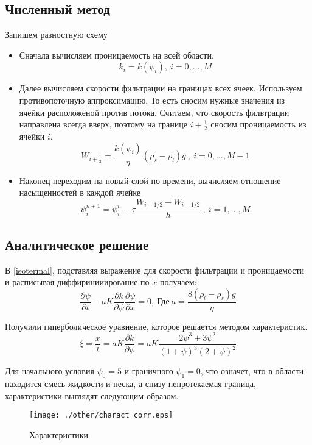 \documentclass[12pt,a4paper]{article}
\newcommand{\pd}[2]{\frac{\partial #1}{\partial #2}}
\begin{document}
\subsection{Численный метод}
Запишем разностную схему
\begin{itemize}
\item Сначала вычисляем проницаемость на всей области.
\begin{equation}
k_i = k(\psi_i) , \ i = 0,  \dots ,M
\label{perm_razn}
\end{equation}

\item Далее вычисляем скорости фильтрации на границах всех ячеек. Используем противопоточную аппроксимацию. То есть сносим нужные значения из ячейки расположеной против потока. Считаем, что скорость фильтрации направлена всегда вверх, поэтому на границе $i + \frac12$ сносим проницаемость из ячейки $i$.
\begin{equation}
W_{i+\frac12} = \frac{k(\psi_i)}{\eta}(\rho_s-\rho_l)g \ , \ i = 0,  \dots ,M-1
\label{Darsi_razn}
\end{equation}

\item Наконец переходим на новый слой по времени, вычисляем отношение насыщенностей в каждой ячейке
\begin{equation}
\psi_i^{n+1} = \psi_i^n - \tau\frac{W_{i+1/2} - W_{i-1/2}}{h} \ , \ i = 1,  \dots ,M
\label{filtr_razn}
\end{equation}
\end{itemize}

\subsection{Аналитическое решение}
В \eqref{isotermal}, подставляя выражение для скорости фильтрации и проницаемости и расписывая диффиринииирование по $x$ получаем:
\begin{equation}
\pd{\psi}{t} - a K \pd{k}{\psi} \pd{\psi}{x} = 0,\  \text{Где}\ a = \frac{8(\rho_l-\rho_s)g}{\eta}
\label{characteristics}
\end{equation}

Получили гиперболическое уравнение, которое решается методом характеристик. 
$$
\xi = \frac{x}{t} = a K \pd{k}{\psi} =   a K \frac{2\psi^3 + 3\psi^2}{(1 + \psi)^3(2+\psi)^2}
$$

Для начального условия $\psi_0 = 5$ и граничного $\psi_1 = 0$, что означет, что в области находится смесь жидкости и песка, а снизу непротекаемая граница, характеристики выглядят следующим образом.
\begin{figure}[h!]
\begin{center}
\texttt{[image: ./other/charact\_corr.eps]}
\caption{Характеристики}
\end{center}
\end{figure}
\end{document}
